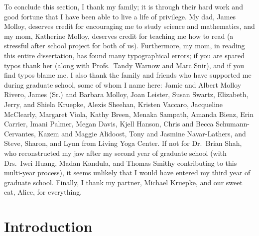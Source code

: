 \documentclass[tocnosub, noragright, centerchapter, fullpagesingle, 12pt]{uiuc_csthesis18}
\numberwithin{algocf}{chapter}
\theoremstyle{definition}
\begin{document}
\begin{acknowledgments}
To conclude this section, I thank my family; it is through their hard work and good fortune that I have been able to live a life of privilege.
My dad, James Molloy, deserves credit for encouraging me to study science and mathematics, and my mom, Katherine Molloy, deserves credit for teaching me how to read (a stressful after school project for both of us).
Furthermore, my mom, in reading this entire dissertation, has found many typographical errors; if you are spared typos thank her (along with Profs.~Tandy Warnow and Marc Snir), and if you find typos blame me.
I also thank the family and friends who have supported me during graduate school, some of whom I name here: Jamie and Albert  Molloy Rivero, James (Sr.) and Barbara Molloy, Joan Leister, Susan Swartz, Elizabeth, Jerry, and Shiela Kruepke, Alexis Sheehan, Kristen Vaccaro, Jacqueline McClearly, Margaret Viola, Kathy Breen, Menaka Sampath, Amanda Bienz, Erin Carrier, Imani Palmer, Megan Davis, Kjell Hanson, Chris and Becca Schumann-Cervantes, Kazem and Maggie Alidoost, Tony and Jasmine Navar-Lathers, and Steve, Sharon, and Lynn from Living Yoga Center.
If not for Dr.~Brian Shah, who reconstructed my jaw after my second year of graduate school (with Drs.~Iwei Huang, Madan Kandula, and Thomas Smithy contributing to this multi-year process), it seems unlikely that I would have entered my third year of graduate school.
Finally, I thank my partner, Michael Kruepke, and our sweet cat, Alice, for everything.
\end{acknowledgments}

%
\tableofcontents

%
\mainmatter

\chapter{Introduction}
\label{chapter:introduction}

\end{document}
